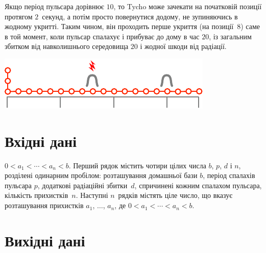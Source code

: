 Якщо період пульсара дорівнює $10$, то Tycho може зачекати на початковій позиції протягом $2$~секунд, а потім просто повернутися додому, не зупиняючись в жодному укритті.
Таким чином, він проходить перше укриття (на позиції~$8$) саме в той момент, коли пульсар спалахує і прибуває до дому в час $20$, із загальним збитком від навколишнього середовища $20$ і жодної шкоди від радіації.

\includegraphics[width=.4\textwidth]{img/sample3.pdf}

\section*{Вхідні дані}

$0<a_1<\cdots <a_n< b$. %
Перший рядок містить чотири цілих числа $b$, $p$, $d$ і $n$, розділені одинарним пробілом:
розташування домашньої бази $b$,
період спалахів пульсара $p$,
додаткові радіаційні збитки~$d$, спричинені кожним спалахом пульсара,
кількість прихистків~$n$.
Наступні $n$~рядків містять ціле число, що вказує розташування прихистків $a_1$, $\ldots$, $a_n$, де
$0<a_1<\cdots <a_n< b$. %

\section*{Вихідні дані}

